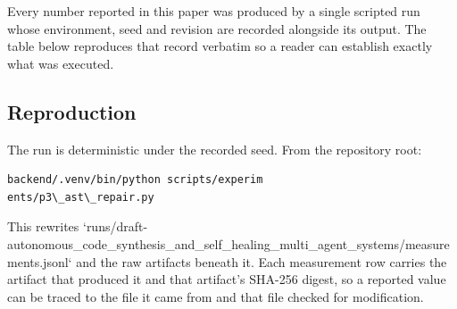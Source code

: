 \documentclass[10pt,journal,compsoc,twocolumn]{IEEEtran}
\begin{document}
Every number reported in this paper was produced by a single scripted run whose environment, seed and revision are recorded alongside its output. The table below reproduces that record verbatim so a reader can establish exactly what was executed.
\begin{table}[htbp]
\centering
{}
\end{table}


\subsection{Reproduction}


The run is deterministic under the recorded seed. From the repository root:


\begin{scriptsize}
\begin{verbatim}
backend/.venv/bin/python scripts/experim
ents/p3\_ast\_repair.py
\end{verbatim}
\end{scriptsize}


This rewrites `runs/draft-autonomous\_code\_synthesis\_and\_self\_healing\_multi\_agent\_systems/measurements.jsonl` and the raw artifacts beneath it. Each measurement row carries the artifact that produced it and that artifact's SHA-256 digest, so a reported value can be traced to the file it came from and that file checked for modification.
\end{document}
